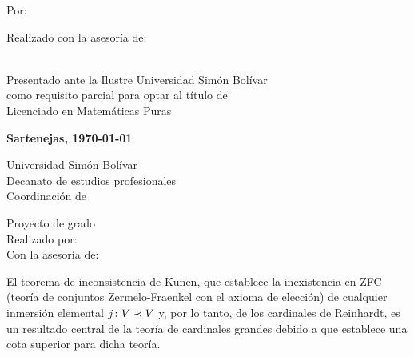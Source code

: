 \documentclass
[
  12pt,
  letterpaper,
  openany,
  oneside,
]{book}
\begin{document}
    \vspace{1.5cm}

    Por:
    \\
    \autor

    \vspace{1.5cm}

    Realizado con la asesoría de:
    \\
    \tutor

    \vspace{3cm}

    \\
    Presentado ante la Ilustre Universidad Simón Bolívar\\
    como requisito parcial para optar al título de\\
    Licenciado en Matemáticas Puras

    \vspace{\fill}

    \textbf{Sartenejas, \today}\par
\egroup
\fi
\ifresumen\newpage
\pagestyle{plain}
\setcounter{page}{4}
%
\PrintUsbLogo
    {
        Universidad Simón Bolívar\\
        Decanato de estudios profesionales\\
        Coordinación de \coord
    }

\begin{center}
    \begin{minipage}{14cm}
        \centering
        \UppercaseBold
            {
                \MainTitle
            }
    \end{minipage}

    \vspace{.5cm}

    \UpperCase
        {
            Proyecto de grado
        } \\
    Realizado por: \autor \\
    Con la asesoría de: \tutor \\[.5cm]

\end{center}

El teorema de inconsistencia de Kunen, que establece la inexistencia en
ZFC (teoría de conjuntos Zermelo-Fraenkel con el axioma de elección)
de cualquier inmersión elemental $j\colon V\prec V$ y, por lo tanto, de los cardinales
de Reinhardt, es un resultado central de la teoría de cardinales grandes
debido a que establece una cota superior para dicha teoría.
\end{document}
